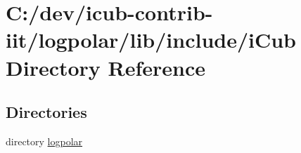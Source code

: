 \section{C\+:/dev/icub-\/contrib-\/iit/logpolar/lib/include/i\+Cub Directory Reference}
\label{dir_05906369c2d654c318c8e5f0b9121080}
\subsection*{Directories}
\begin{DoxyCompactItemize}
\item 
directory \hyperlink{dir_91e39feb63cd5b600f38a08a13f12297}{logpolar}
\end{DoxyCompactItemize}
